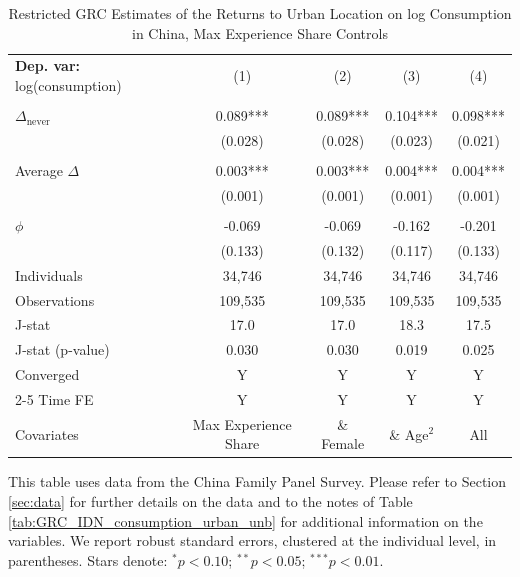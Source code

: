 \begin{table}[htbp] \centering \begin{threeparttable}
 \caption{Restricted GRC Estimates of the Returns to Urban Location on log Consumption in China, Max Experience Share Controls} 
 \label{tab:GRC_CHN_consumption_urban_unb_exp_m_sh} 
\begin{tabular}{l cccc} \toprule  \textbf{Dep. var:}  log(consumption) 
                    &\multicolumn{1}{c}{(1)}   &\multicolumn{1}{c}{(2)}   &\multicolumn{1}{c}{(3)}   &\multicolumn{1}{c}{(4)}   \\
                    &               &               &               &               \\
\addlinespace
$\Delta_{\text{never}}$&       0.089***&       0.089***&       0.104***&       0.098***\\
                    &     (0.028)   &     (0.028)   &     (0.023)   &     (0.021)   \\
                    &               &               &               &               \\
\addlinespace
Average $\Delta$    &       0.003***&       0.003***&       0.004***&       0.004***\\
                    &     (0.001)   &     (0.001)   &     (0.001)   &     (0.001)   \\
                    &               &               &               &               \\
\addlinespace
$\phi$              &      -0.069   &      -0.069   &      -0.162   &      -0.201   \\
                    &     (0.133)   &     (0.132)   &     (0.117)   &     (0.133)   \\
\addlinespace
Individuals         &      34,746   &      34,746   &      34,746   &      34,746   \\
Observations        &     109,535   &     109,535   &     109,535   &     109,535   \\
J-stat              &        17.0   &        17.0   &        18.3   &        17.5   \\
J-stat (p-value)    &       0.030   &       0.030   &       0.019   &       0.025   \\
Converged           &           Y   &           Y   &           Y   &           Y   \\
\cmidrule{2-5} Time FE & Y & Y & Y & Y \\ Covariates & Max Experience Share & \& Female & \& Age$^2$ & All \\ \bottomrule \end{tabular} \begin{tablenotes}[flushleft] \footnotesize \item{This table uses data from the China Family Panel Survey. Please refer to Section \ref{sec:data} for further details on the data and to the notes of Table \ref{tab:GRC_IDN_consumption_urban_unb} for additional information on the variables. We report robust standard errors, clustered at the individual level, in parentheses. Stars denote: $^{*} p<0.10$; $^{**} p<0.05$; $^{***} p<0.01$.} \end{tablenotes} \end{threeparttable} \end{table}
